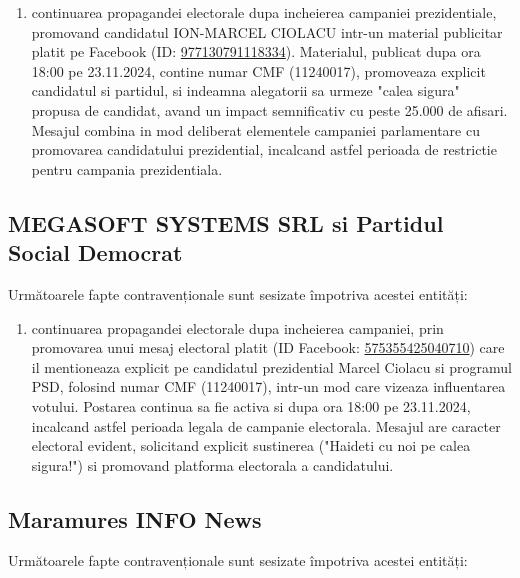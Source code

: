 \documentclass[a4paper,12pt]{article}
\begin{document}
\begin{enumerate}[leftmargin=*, label=\arabic*.)]
    \item continuarea propagandei electorale dupa incheierea campaniei prezidentiale, promovand candidatul ION-MARCEL CIOLACU intr-un material publicitar platit pe Facebook (ID: \href{https://www.facebook.com/ads/library/?id=977130791118334}{977130791118334}). Materialul, publicat dupa ora 18:00 pe 23.11.2024, contine numar CMF (11240017), promoveaza explicit candidatul si partidul, si indeamna alegatorii sa urmeze "calea sigura" propusa de candidat, avand un impact semnificativ cu peste 25.000 de afisari. Mesajul combina in mod deliberat elementele campaniei parlamentare cu promovarea candidatului prezidential, incalcand astfel perioada de restrictie pentru campania prezidentiala.
\end{enumerate}

\vspace{0.5cm}

\subsection{MEGASOFT SYSTEMS SRL si Partidul Social Democrat}
Următoarele fapte contravenționale sunt sesizate împotriva acestei entități:

\begin{enumerate}[leftmargin=*, label=\arabic*.)]
    \item continuarea propagandei electorale dupa incheierea campaniei, prin promovarea unui mesaj electoral platit (ID Facebook: \href{https://www.facebook.com/ads/library/?id=575355425040710}{575355425040710}) care il mentioneaza explicit pe candidatul prezidential Marcel Ciolacu si programul PSD, folosind numar CMF (11240017), intr-un mod care vizeaza influentarea votului. Postarea continua sa fie activa si dupa ora 18:00 pe 23.11.2024, incalcand astfel perioada legala de campanie electorala. Mesajul are caracter electoral evident, solicitand explicit sustinerea ("Haideti cu noi pe calea sigura!") si promovand platforma electorala a candidatului.
\end{enumerate}

\vspace{0.5cm}

\subsection{Maramures INFO News}
Următoarele fapte contravenționale sunt sesizate împotriva acestei entități:
\end{document}
